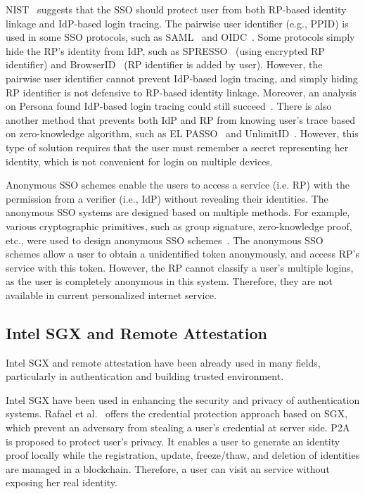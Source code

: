 NIST~\cite{NIST2017draft} suggests that the SSO should protect user from both RP-based identity linkage and IdP-based login tracing. The pairwise user identifier (e.g., PPID) is used in some SSO protocols, such as SAML~\cite{SAML} and OIDC~\cite{OpenIDConnect}. Some protocols simply hide the RP's identity from IdP, such as SPRESSO~\cite{SPRESSO} (using encrypted RP identifier) and BrowserID~\cite{BrowserID} (RP identifier is added by user). However, the pairwise user identifier cannot prevent IdP-based login tracing, and simply hiding RP identifier is not defensive to RP-based identity linkage. Moreover, an analysis on Persona found IdP-based login tracing could still succeed~\cite{FettKS14, BrowserID}.
There is also another method that prevents both IdP and RP from knowing user's trace based on zero-knowledge algorithm, such as EL PASSO~\cite{ZhangKSZR21} and UnlimitID~\cite{IsaakidisHD16}. However, this type of solution requires that the user must remember a secret representing her identity, which is not convenient for login on multiple devices.

Anonymous SSO schemes enable the users to access a service (i.e. RP) with the permission from a verifier (i.e., IdP) without revealing their identities.
The anonymous SSO systems are designed based on multiple methods. For example, various cryptographic primitives, such as group signature, zero-knowledge proof, etc., were used to design anonymous SSO schemes~\cite{WangWS13,HanCSTW18}. 
The anonymous SSO schemes allow a user to obtain a unidentified token anonymously, and access RP's service with this token. However, the RP cannot classify a user's multiple logins, as the user is completely anonymous in this system. Therefore, they are not available in current personalized internet service.

\subsection{Intel SGX and Remote Attestation}
Intel SGX and remote attestation have been already used in many fields, particularly in authentication and building trusted environment. 

Intel SGX have been used in enhancing the security and privacy of authentication systems. Rafael et al.~\cite{CondeMW18} offers the credential protection approach based on SGX, which prevent an adversary from stealing a user's credential at server side. P2A~\cite{SongWLOWL20} is proposed to protect user's privacy. It enables a user to generate an identity proof locally while the registration, update, freeze/thaw, and deletion of identities are managed in a blockchain. Therefore, a user can visit an service without exposing her real identity. 

